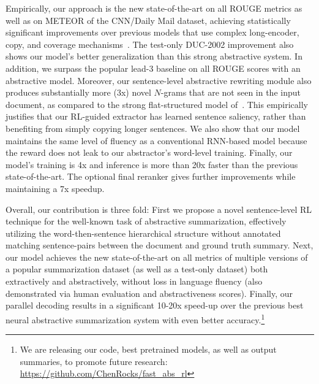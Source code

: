 \documentclass[11pt,a4paper]{article}
\begin{document}
Empirically, our approach is the new state-of-the-art on all ROUGE metrics \citep{lin:2004:ACLsummarization} as well as on METEOR \cite{denkowski:lavie:meteor-wmt:2014} of the CNN/Daily Mail dataset, achieving statistically significant improvements over previous models that use complex long-encoder, copy, and coverage mechanisms~\citep{get_to_the_point}.
The test-only DUC-2002 improvement also shows our model's better generalization than this strong abstractive system.
In addition, we surpass the popular lead-3 baseline on all ROUGE scores with an abstractive model. Moreover, our sentence-level abstractive rewriting module also produces substantially more (3x) novel $N$-grams that are not seen in the input document, as compared to the strong flat-structured model of~.
This empirically justifies that our RL-guided extractor has learned sentence saliency, rather than benefiting from simply copying longer sentences.
We also show that our model maintains the same level of fluency as a conventional RNN-based model because the reward does not leak to our abstractor's word-level training.
Finally, our model's training is 4x and inference is more than 20x faster than the previous state-of-the-art. The optional final reranker gives further improvements while maintaining a 7x speedup.

Overall, our contribution is three fold: 
First we propose a novel sentence-level RL technique for the well-known task of abstractive summarization, effectively utilizing the word-then-sentence hierarchical structure without annotated matching sentence-pairs between the document and ground truth summary.
Next, our model achieves the new state-of-the-art on all metrics of multiple versions of a popular summarization dataset (as well as a test-only dataset) both extractively and abstractively, without loss in language fluency (also demonstrated via human evaluation and abstractiveness scores). 
Finally, our parallel decoding results in a significant 10-20x speed-up over the previous best neural abstractive summarization system with even better accuracy.\footnote{We are releasing our code, best pretrained models, as well as output summaries, to promote future research: \url{https://github.com/ChenRocks/fast_abs_rl}} 
\end{document}
